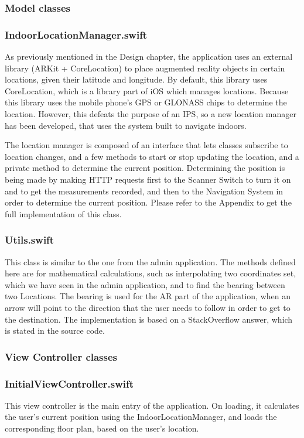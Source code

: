 \subsubsection{Model classes}
\subsubsection*{IndoorLocationManager.swift}
As previously mentioned in the Design chapter, the application uses an external library (ARKit + CoreLocation) to place augmented reality objects in certain locations, given their latitude and longitude. By default, this library uses CoreLocation, which is a library part of iOS which manages locations. Because this library uses the mobile phone's GPS or GLONASS chips to determine the location. However, this defeats the purpose of an IPS, so a new location manager has been developed, that uses the system built to navigate indoors. 

The location manager is composed of an interface that lets classes subscribe to location changes, and a few methods to start or stop updating the location, and a private method to determine the current position. Determining the position is being made by making HTTP requests first to the Scanner Switch to turn it on and to get the measurements recorded, and then to the Navigation System in order to determine the current position. Please refer to the Appendix to get the full implementation of this class.

\subsubsection*{Utils.swift}
This class is similar to the one from the admin application. The methods defined here are for mathematical calculations, such as interpolating two coordinates set, which we have seen in the admin application, and to find the bearing between two Locations. The bearing is used for the AR part of the application, when an arrow will point to the direction that the user needs to follow in order to get to the destination. The implementation is based on a StackOverflow answer, which is stated in the source code.

\subsubsection{View Controller classes}
\subsubsection*{InitialViewController.swift}
This view controller is the main entry of the application. On loading, it calculates the user's current position using the IndoorLocationManager, and loads the corresponding floor plan, based on the user's location.

